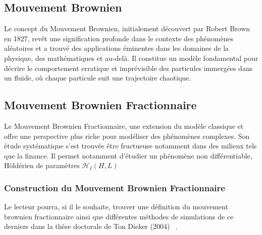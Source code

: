\subsection{Mouvement Brownien}

Le concept du Mouvement Brownien, initialement découvert par Robert Brown en 1827, revêt une signification profonde dans le contexte des phénomènes aléatoires et a trouvé des applications éminentes dans les domaines de la physique, des mathématiques et au-delà. Il constitue un modèle fondamental pour décrire le comportement erratique et imprévisible des particules immergées dans un fluide, où chaque particule suit une trajectoire chaotique.

\subsection{Mouvement Brownien Fractionnaire}

Le Mouvement Brownien Fractionnaire, une extension du modèle classique et offre une perspective plus riche pour modéliser des phénomènes complexes. Son étude systématique s'est trouvée être fructueuse notamment dans des milieux tels que la finance. Il permet notamment d'étudier un phénomène non différentiable, Höldérien de paramètres $\mathcal H_I (H, L)$

\subsubsection{Construction du Mouvement Brownien Fractionnaire}
Le lecteur pourra, si il le souhaite, trouver une définition du mouvement brownien fractionnaire ainsi que différentes méthodes de simulations de ce derniers dans la thèse doctorale de Ton Dieker (2004) ~\cite{dieker2004simulation}.
\citer{
Un mouvement Brownien fractionnaire normalisé $B_H = \{ B_H(t) : t\in \mathds R_+, H \in ]0,1[ \,\}$ est caractérisé de façon unique par :
$$
	\begin{array}{l}
		\textsf{les incréments de } B_H(t) \textsf{ sont stationnaires }
		\\
		B_H(0) = 0
		\\
		\forall t \in \mathds R_+ \quad \esperance{B_H(t)} = 0
		\\
		\forall t \in \mathds R_+ \quad \mathds E |B_H(t)|^2 = t^{2H} = \sigma^2_H(t)
		\\
		\forall t > 0 \quad B_H(t) \sim \mathcal N(0, \sigma^2_H(t) )
		\\
		C_{B_H}(u,v) = \esperance{B_H(u)B_H(v)} = \frac 1 2 \bigl[ u^{2H} + v^{2H} + |u-v|^{2H}  \bigr]
	\end{array}
$$

\begin{flushright}
	source : Diecker, 2004 ~\cite{dieker2004simulation}
\end{flushright}
}

